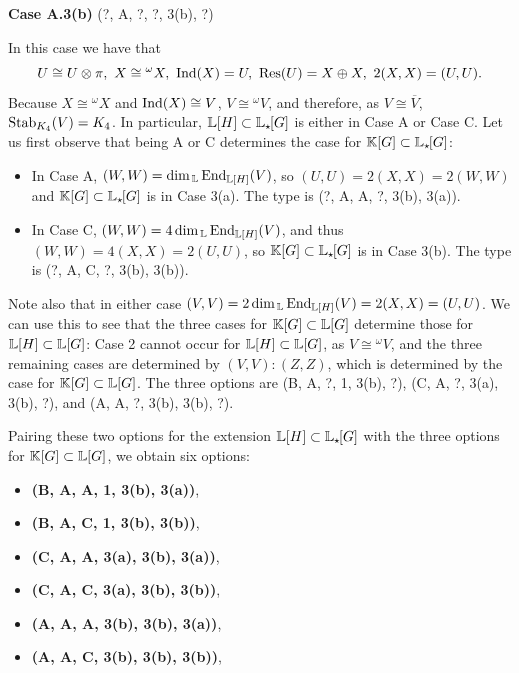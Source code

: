\vspace{0.5em}
\noindent \textbf{Case A.3(b)} (?, A, ?, ?, 3(b), ?)

In this case we have that 
\[
U \cong U \otimes \pi, \ X \cong {}^{\omega} X, \ \Ind(X) = U, \ \Res(U) = X \oplus X, \ 2(X,X) = (U,U).
\]
Because $X \cong {}^{\omega} X$ and $\operatorname{Ind}(X) \cong V$, $V \cong {}^{\omega} V$, and therefore, as $V \cong \overline{V}$, $\operatorname{Stab}_{K_4}(V) = K_4$. In particular, ${\mathbb L}[H] \subset {\mathbb L}_{\star \hspace{-0.1em}}[G]$ is either in Case A or Case C. Let us first observe that being A or C determines the case for ${\mathbb K}[G] \subset {\mathbb L}_{\star \hspace{-0.1em}}[G]$: 

\begin{itemize}
    \item In Case A, $(W,W) = \dim_{\, {\mathbb L}} \operatorname{End}_{{\mathbb L}[H]}(V)$, so $(U,U) = 2(X,X) = 2 (W,W)$ and ${\mathbb K}[G] \subset {\mathbb L}_{\star \hspace{-0.1em}}[G]$ is in Case 3(a). The type is (?, A, A, ?, 3(b), 3(a)).
    \item In Case C, $(W,W) = 4 \dim_{\, {\mathbb L}} \operatorname{End}_{{\mathbb L}[H]}(V)$, and thus $(W,W) = 4 (X,X) = 2(U,U)$, so ${\mathbb K}[G] \subset {\mathbb L}_{\star \hspace{-0.1em}}[G]$ is in Case 3(b). The type is (?, A, C, ?, 3(b), 3(b)).
\end{itemize}

Note also that in either case $(V,V) = 2 \dim_{\, {\mathbb L}} \operatorname{End}_{{\mathbb L}[H]}(V) = 2(X,X) = (U,U)$. We can use this to see that the three cases for ${\mathbb K}[G] \subset {\mathbb L}[G]$ determine those for ${\mathbb L}[H] \subset {\mathbb L}[G]$: Case 2 cannot occur for ${\mathbb L}[H] \subset {\mathbb L}[G]$, as $V \cong {}^{\omega}V$, and the three remaining cases are determined by $(V,V):(Z,Z)$, which is determined by the case for ${\mathbb K}[G] \subset {\mathbb L}[G]$. The three options are (B, A, ?, 1, 3(b), ?), (C, A, ?, 3(a), 3(b), ?), and (A, A, ?, 3(b), 3(b), ?).

Pairing these two options for the extension ${\mathbb L}[H] \subset {\mathbb L}_{\star \hspace{-0.1em}}[G]$ with the three options for ${\mathbb K}[G] \subset {\mathbb L}[G]$, we obtain six options:
\begin{itemize}
     \item \textbf{(B, A, A, 1, 3(b), 3(a))},
     \item \textbf{(B, A, C, 1, 3(b), 3(b))},
     \item \textbf{(C, A, A, 3(a), 3(b), 3(a))},
     \item \textbf{(C, A, C, 3(a), 3(b), 3(b))},
     \item \textbf{(A, A, A, 3(b), 3(b), 3(a))},
     \item \textbf{(A, A, C, 3(b), 3(b), 3(b))},
\end{itemize}

